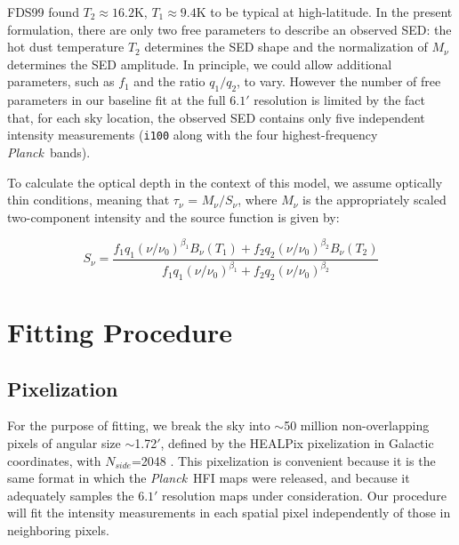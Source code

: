 \documentclass{emulateapj}
\newcommand{\PLANCK}{{\it Planck}}
\begin{document}
FDS99 found $T_2 \approx 16.2$K, $T_1 \approx 9.4$K to be typical at 
high-latitude. In the present formulation, there are only two free parameters 
to describe an observed SED: the hot dust temperature $T_2$ determines the SED 
shape and the normalization of $M_{\nu}$ determines the SED amplitude. In 
principle, we could allow additional parameters, such as $f_1$ and the ratio 
$q_1/q_2$, to vary. However the number of free parameters in our baseline fit 
at the full $6.1'$ resolution is limited by the fact that, for each sky 
location, the observed SED contains only five independent intensity 
measurements (\verb|i100| along with the four highest-frequency \PLANCK~bands).

To calculate the optical depth in the context of this model, we assume
optically thin conditions, meaning that $\tau_{\nu}$ = $M_{\nu}/S_{\nu}$, where
$M_{\nu}$ is the appropriately scaled two-component intensity and the source
function is given by:

\begin{equation}
\label{eqn:source}
S_{\nu} = \frac{f_1q_1(\nu/\nu_0)^{\beta_1}B_{\nu}(T_1) + f_2q_2(\nu/\nu_0)^{\beta_2}B_{\nu}(T_2)}{f_1q_1(\nu/\nu_0)^{\beta_1}+f_2q_2(\nu/\nu_0)^{\beta_2}}
\end{equation}

\section{Fitting Procedure}
\label{sec:fitting}


\subsection{Pixelization}
\label{sec:pix}
For the purpose of fitting, we break the sky into $\sim$50 million 
non-overlapping pixels of angular size $\sim$1.72$'$, defined by the HEALPix 
pixelization in Galactic coordinates, with $N_{side}$=2048 \citep{healpix}. 
This pixelization is convenient because it is the same format in which the 
\PLANCK~HFI maps were released, and because it adequately samples the $6.1'$ 
resolution maps under consideration. Our procedure will fit the intensity 
measurements in each spatial pixel independently of those in neighboring 
pixels.
\end{document}
